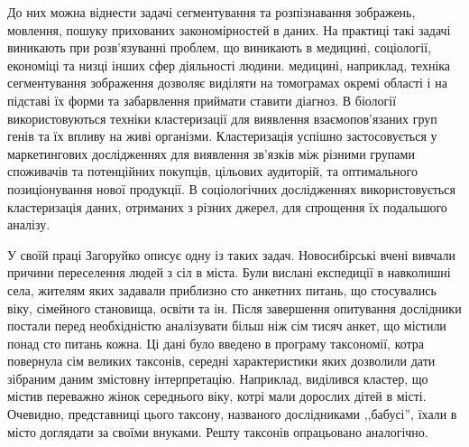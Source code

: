     До них можна віднести задачі сегментування та розпізнавання зображень, мовлення, пошуку прихованих закономірностей в даних. На практиці такі задачі виникають при розв'язуванні проблем, що виникають в медицині, соціології, економіці та низці інших сфер діяльності людини. 
     медицині, наприклад, техніка сегментування зображення дозволяє виділяти на томограмах окремі області і на підставі їх форми та забарвлення приймати ставити діагноз. 
    В біології використовуються техніки кластеризації для виявлення взаємопов'язаних груп генів та їх впливу на живі організми. 
    Кластеризація успішно застосовується у маркетингових дослідженнях для виявлення зв'язків між різними групами споживачів та потенційних покупців, цільових аудиторій, та оптимального позиціонування нової продукції. 
    В соціологічних дослідженнях використовується кластеризація даних, отриманих з різних джерел, для спрощення їх подальшого аналізу. 

    У своїй праці \cite{Zagorujko} Загоруйко описує одну із таких задач. Новосибірські вчені вивчали причини переселення людей з сіл в міста. Були вислані експедиції в навколишні села, жителям яких задавали приблизно сто анкетних питань, що стосувались віку, сімейного становища, освіти та ін. Після завершення опитування дослідники постали перед необхідністю аналізувати більш ніж сім тисяч анкет, що містили понад сто питань кожна. 
    Ці дані було введено в програму таксономії, котра повернула сім великих таксонів, середні характеристики яких дозволили дати зібраним даним змістовну інтерпретацію. Наприклад, виділився кластер, що містив переважно жінок середнього віку, котрі мали дорослих дітей в місті. Очевидно, представниці цього таксону, названого дослідниками ,,бабусі'', їхали в місто доглядати за своїми внуками. Решту таксонів опрацьовано аналогічно.

